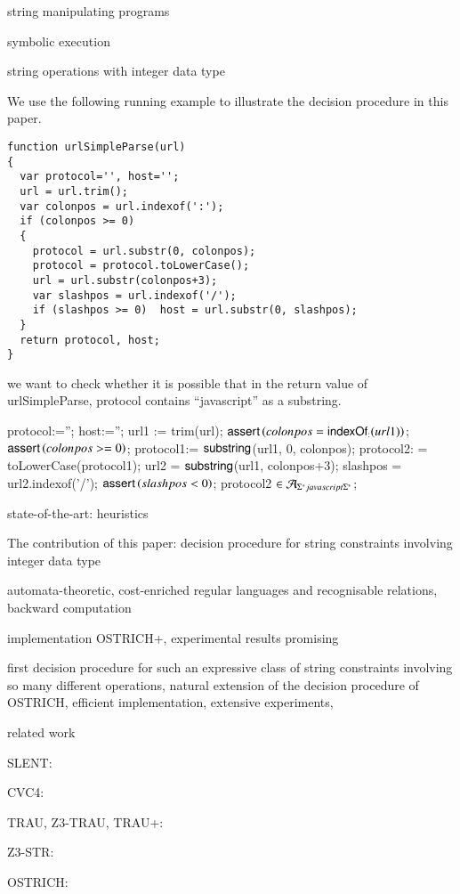 
string manipulating programs

symbolic execution

string operations with integer data type

We use the following running example to illustrate the decision procedure in this paper.
{\small
\begin{verbatim}
function urlSimpleParse(url)
{
  var protocol='', host='';
  url = url.trim();
  var colonpos = url.indexof(':');
  if (colonpos >= 0) 
  {
    protocol = url.substr(0, colonpos);
    protocol = protocol.toLowerCase();
    url = url.substr(colonpos+3);
    var slashpos = url.indexof('/');
    if (slashpos >= 0)  host = url.substr(0, slashpos); 
  }
  return protocol, host; 
}
\end{verbatim}
}

we want to check whether it is possible that in the return value of urlSimpleParse, protocol contains ``javascript'' as a substring.

protocol:=''; host:='';
url1 := trim(url);
$\textsf{assert}\left(colonpos = \mathsf{indexOf}_{:}(url1)\right)$;
$\textsf{assert}\left(colonpos>=0\right)$;
protocol1:= $\mathsf{substring}$(url1, 0, colonpos);
protocol2: = toLowerCase(protocol1);
url2 = $\mathsf{substring}$(url1, colonpos+3);
slashpos = url2.indexof('/');
$\textsf{assert}\left(slashpos < 0\right)$;
protocol2 $\in \mathcal{A}_{\Sigma^*javascript\Sigma^*}$;



state-of-the-art: heuristics

The contribution of this paper: decision procedure for string constraints involving integer data type

automata-theoretic, cost-enriched regular languages and recognisable relations, backward computation

implementation OSTRICH+, experimental results promising

first decision procedure for such an expressive class of string constraints involving so many different operations, natural extension of the decision procedure of OSTRICH, efficient implementation, extensive experiments, 


related work

SLENT: \cite{WC+18}

CVC4: \cite{cvc4}

TRAU, Z3-TRAU, TRAU+: \cite{Abdulla17,AbdullaA+19}

Z3-STR: \cite{Z3-str}

OSTRICH: \cite{CHL+19}